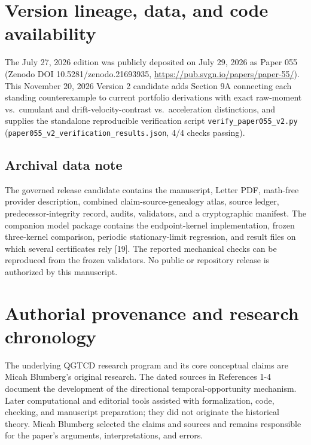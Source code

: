 \documentclass[
  american,
  11pt,
  letterpaper,
]{article}
\begin{document}
\section{Version lineage, data, and code availability}\label{version-lineage-data-and-code-availability}

The July 27, 2026 edition was publicly deposited on July 29, 2026 as Paper 055 (Zenodo DOI 10.5281/zenodo.21693935, \url{https://pub.svgn.io/papers/paper-55/}). This November 20, 2026 Version 2 candidate adds Section 9A connecting each standing counterexample to current portfolio derivations with exact raw-moment vs.~cumulant and drift-velocity-contrast vs.~acceleration distinctions, and supplies the standalone reproducible verification script \nolinkurl{verify_paper055_v2.py} (\nolinkurl{paper055_v2_verification_results.json}, 4/4 checks passing).

\subsection{Archival data note}\label{archival-data-note}

The governed release candidate contains the manuscript, Letter PDF, math-free provider description, combined claim-source-genealogy atlas, source ledger, predecessor-integrity record, audits, validators, and a cryptographic manifest. The companion model package contains the endpoint-kernel implementation, frozen three-kernel comparison, periodic stationary-limit regression, and result files on which several certificates rely {[}19{]}. The reported mechanical checks can be reproduced from the frozen validators. No public or repository release is authorized by this manuscript.

\section{Authorial provenance and research chronology}\label{authorial-provenance-and-research-chronology}

The underlying QGTCD research program and its core conceptual claims are Micah Blumberg's original research. The dated sources in References 1-4 document the development of the directional temporal-opportunity mechanism. Later computational and editorial tools assisted with formalization, code, checking, and manuscript preparation; they did not originate the historical theory. Micah Blumberg selected the claims and sources and remains responsible for the paper's arguments, interpretations, and errors.
\end{document}
